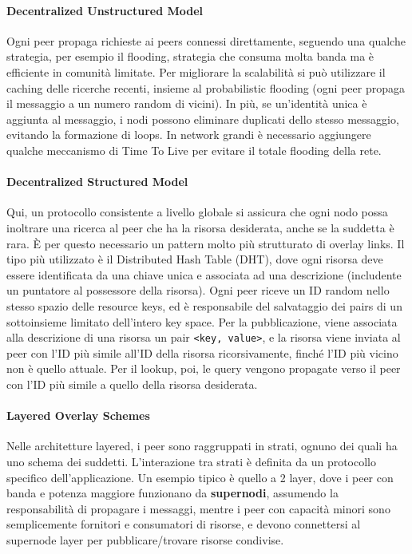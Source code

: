 \documentclass[11pt]{article}
\newcommand{\code}[1]{\texttt{#1}}
\begin{document}
\paragraph{Decentralized Unstructured Model} Ogni peer propaga richieste ai peers connessi direttamente, seguendo una qualche strategia, per esempio il flooding, strategia che consuma molta banda ma è efficiente in comunità limitate. Per migliorare la scalabilità si può utilizzare il caching delle ricerche recenti, insieme al probabilistic flooding (ogni peer propaga il messaggio a un numero random di vicini). In più, se un'identità unica è aggiunta al messaggio, i nodi possono eliminare duplicati dello stesso messaggio, evitando la formazione di loops. In network grandi è necessario aggiungere qualche meccanismo di Time To Live per evitare il totale flooding della rete.
\paragraph{Decentralized Structured Model} Qui, un protocollo consistente a livello globale si assicura che ogni nodo possa inoltrare una ricerca al peer che ha la risorsa desiderata, anche se la suddetta è rara. È per questo necessario un pattern molto più strutturato di overlay links. Il tipo più utilizzato è il Distributed Hash Table (DHT), dove ogni risorsa deve essere identificata da una chiave unica e associata ad una descrizione (includente un puntatore al possessore della risorsa). Ogni peer riceve un ID random nello stesso spazio delle resource keys, ed è responsabile del salvataggio dei pairs di un sottoinsieme limitato dell'intero key space. Per la pubblicazione, viene associata alla descrizione di una risorsa un pair \code{<key, value>}, e la risorsa viene inviata al peer con l'ID più simile all'ID della risorsa ricorsivamente, finché l'ID più vicino non è quello attuale. Per il lookup, poi, le query vengono propagate verso il peer con l'ID più simile a quello della risorsa desiderata.
\paragraph{Layered Overlay Schemes} Nelle architetture layered, i peer sono raggruppati in strati, ognuno dei quali ha uno schema dei suddetti. L'interazione tra strati è definita da un protocollo specifico dell'applicazione. Un esempio tipico è quello a 2 layer, dove i peer con banda e potenza maggiore funzionano da \textbf{supernodi}, assumendo la responsabilità di propagare i messaggi, mentre i peer con capacità minori sono semplicemente fornitori e consumatori di risorse, e devono connettersi al supernode layer per pubblicare/trovare risorse condivise. 
\end{document}
